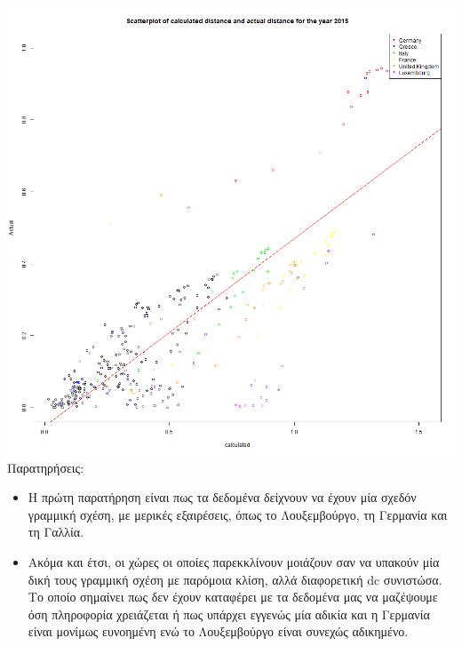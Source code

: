 \documentclass[a4paper,twoside,10pt]{article}
\begin{document}
	\includegraphics[width = \textwidth]{images/scatterplot_with_regression_line_ 2015 .png}
	Παρατηρήσεις:
	\begin{itemize}
		\item Η πρώτη παρατήρηση είναι πως τα δεδομένα δείχνουν να έχουν μία σχεδόν γραμμική σχέση, με μερικές εξαιρέσεις, όπως το Λουξεμβούργο, τη Γερμανία και τη Γαλλία.
		\item Ακόμα και έτσι, οι χώρες οι οποίες παρεκκλίνουν μοιάζουν σαν να υπακούν μία δική τους γραμμική σχέση με παρόμοια κλίση, αλλά διαφορετική dc συνιστώσα. Το οποίο σημαίνει πως δεν έχουν καταφέρει με τα δεδομένα μας να μαζέψουμε όση πληροφορία χρειάζεται ή πως υπάρχει εγγενώς μία αδικία και η Γερμανία είναι μονίμως ευνοημένη ενώ το Λουξεμβούργο είναι συνεχώς αδικημένο. 
	\end{itemize}
\end{document}
